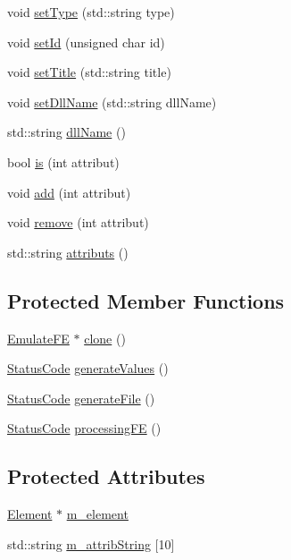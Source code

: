 \begin{DoxyCompactItemize}
\item 
void \hyperlink{classObject_aae534cc9d982bcb9b99fd505f2e103a5}{setType} (std::string type)
\item 
void \hyperlink{classObject_a398fe08cba594a0ce6891d59fe4f159f}{setId} (unsigned char id)
\item 
void \hyperlink{classObject_a89557dbbad5bcaa02652f5d7fa35d20f}{setTitle} (std::string title)
\item 
void \hyperlink{classObject_a870c5af919958c2136623b2d7816d123}{setDllName} (std::string dllName)
\item 
std::string \hyperlink{classObject_a2e3947f2870094c332d7454117f3ec63}{dllName} ()
\item 
bool \hyperlink{classAttrib_a704f26af560909ad22065083bb7d4c34}{is} (int attribut)
\item 
void \hyperlink{classAttrib_a235f773af19c900264a190b00a3b4ad7}{add} (int attribut)
\item 
void \hyperlink{classAttrib_a7d4ef7e32d93cb287792b87b857e79f3}{remove} (int attribut)
\item 
std::string \hyperlink{classAttrib_aee7bbf16b144887f196e1341b24f8a26}{attributs} ()
\end{DoxyCompactItemize}
\subsection*{Protected Member Functions}
\begin{DoxyCompactItemize}
\item 
\hyperlink{classEmulateFE}{EmulateFE} $\ast$ \hyperlink{classEmulateFE_a9a704d0081a275410d19071a006f1a80}{clone} ()
\item 
\hyperlink{classStatusCode}{StatusCode} \hyperlink{classEmulateFE_ae557d3569b9285a871c502b93ba20494}{generateValues} ()
\item 
\hyperlink{classStatusCode}{StatusCode} \hyperlink{classEmulateFE_ae62bc56b44c4bcdf7f5eab5cbde2cd69}{generateFile} ()
\item 
\hyperlink{classStatusCode}{StatusCode} \hyperlink{classEmulateFE_adf7213a308c8a04f4d7efbb86a13689e}{processingFE} ()
\end{DoxyCompactItemize}
\subsection*{Protected Attributes}
\begin{DoxyCompactItemize}
\item 
\hyperlink{classElement}{Element} $\ast$ \hyperlink{classProcessus_aa9d24d53c3e52f36786cabb5d8e296e7}{m\_\-element}
\item 
std::string \hyperlink{classAttrib_a3414521d7a82476e874b25a5407b5e63}{m\_\-attribString} \mbox{[}10\mbox{]}
\end{DoxyCompactItemize}
